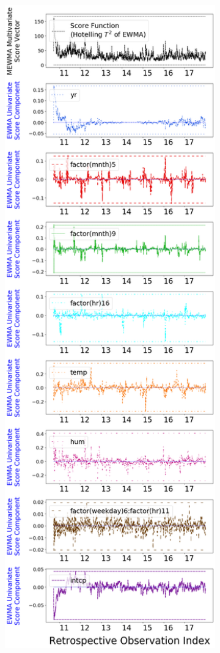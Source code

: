 \documentclass[twoside,11pt]{article}
\begin{document}
\begin{figure}[H]
\centering
    \begin{subfigure}[t]{0.304\linewidth}
     \centering
         \includegraphics[width=1.0\textwidth, trim=.0in .0in .0in .0in, clip]{../figures/v14/bike_sharing/reg_lin_C/quadr/PII_pos_single_retro_bike_fisher_mlines_with_regu_1e-08_0_0001_0_01_99_99.png}

\end{subfigure}
\end{figure}
\end{document}
